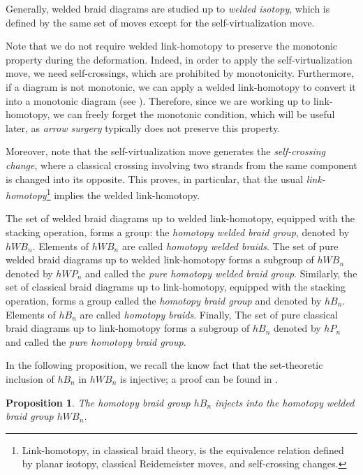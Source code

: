 \documentclass[11pt, a4paper, twoside,reqno]{amsart}
\theoremstyle{plain}
\newtheorem{prop}[thm]{Proposition}
\theoremstyle{definition}
\theoremstyle{remark}
\begin{document}
Generally, welded braid diagrams are studied up to \emph{welded isotopy}, which is defined by the same set of moves except for the self-virtualization move. 

Note that we do not require welded link-homotopy to preserve the monotonic property during the deformation. Indeed, in order to apply the self-virtualization move, we need self-crossings, which are prohibited by monotonicity. Furthermore, if a diagram is not monotonic, we can apply a welded link-homotopy to convert it into a monotonic diagram (see \cite[Thm. 4.1]{ABMWUsualVirtualWeldedObjHomotopy}). Therefore, since we are working up to link-homotopy, we can freely forget the monotonic condition, which will be useful later, as \emph{arrow surgery} typically does not preserve this property. 

Moreover, note that the self-virtualization move generates the \emph{self-crossing change}, where a classical crossing involving two strands from the same component is changed into its opposite. This proves, in particular, that the usual \emph{link-homotopy}\footnote{Link-homotopy, in classical braid theory, is the equivalence relation defined by planar isotopy, classical Reidemeister moves, and self-crossing changes.} implies the welded link-homotopy.

The set of welded braid diagrams up to welded link-homotopy, equipped with the stacking operation, forms a group: the \emph{homotopy welded braid group}, denoted by $hWB_n$. Elements of $hWB_n$ are called \emph{homotopy welded braids}. The set of pure welded braid diagrams up to welded link-homotopy forms a subgroup of $hWB_n$ denoted by $hWP_n$ and called the \emph{pure homotopy welded braid group}. Similarly, the set of classical braid diagrams up to link-homotopy, equipped with the stacking operation, forms a group called the \emph{homotopy braid group} and denoted by $hB_n$. Elements of $hB_n$ are called \emph{homotopy braids}. Finally, The set of pure classical braid diagrams up to link-homotopy forms a subgroup of $hB_n$ denoted by $hP_n$ and called the \emph{pure homotopy braid group}. 

In the following proposition, we recall the know fact that the set-theoretic inclusion of $hB_n$ in $hWB_n$ is injective; a proof can be found in \cite[Prop. 4.2.23]{Moithese}.

\begin{prop}\label{propbraidembedinwelded}
The homotopy braid group $hB_n$ injects into the homotopy welded braid group $hWB_n$.
\end{prop}
\end{document}
